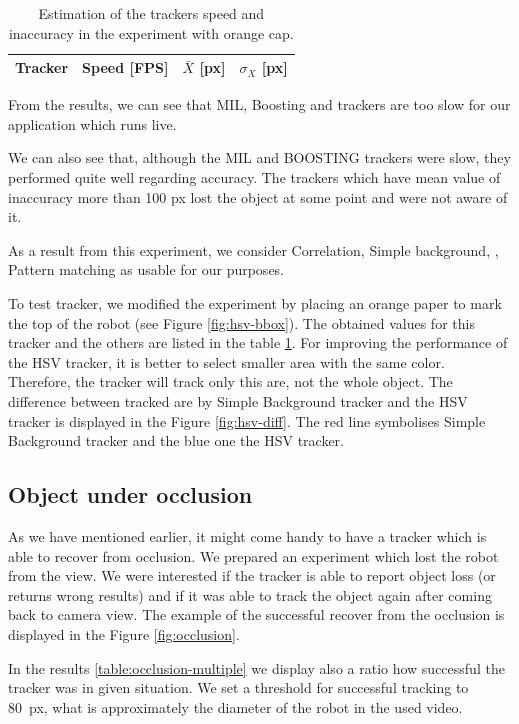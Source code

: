 \begin{table}
\centering
\begin{tabular}{l|r|r|r}
Tracker	& Speed [FPS] & $\bar{X}$ [px] & $\sigma_X$ [px] \\
\hline

\end{tabular}
\caption{Estimation of the trackers speed and inaccuracy in the experiment with orange cap.}
\label{table:hsv}
\end{table}

From the results, we can see that MIL, Boosting and \tld{} trackers are too slow
for our application which runs live.

We can also see that, although the MIL and BOOSTING trackers were slow, they
performed quite well regarding accuracy. The trackers which have mean value of
inaccuracy more than 100 px lost the object at some point and were not aware of
it.

As a result from this experiment, we consider Correlation, Simple background,
\medflow{}, Pattern matching as usable for our purposes.

To test \hsv{} tracker, we modified the experiment by placing an orange paper to
mark the top of the robot (see Figure \ref{fig:hsv-bbox}). The obtained
values for this tracker and the others are listed in the table \ref{table:hsv}.
For improving the performance of the HSV tracker, it is better to select
smaller area with the same color. Therefore, the tracker will track only this
are, not the whole object. The difference between tracked are by Simple
Background tracker and the HSV tracker is displayed in the Figure
\ref{fig:hsv-diff}. The red line symbolises Simple Background tracker and the
blue one the HSV tracker.

\subsection{Object under occlusion}

As we have mentioned earlier, it might come handy to have a tracker which is
able to recover from occlusion. We prepared an experiment which lost the
robot from the view. We were interested if the tracker is able to report object
loss (or returns wrong results) and if it was able to track the object again
after coming back to camera view. The example of the successful recover from
the occlusion is displayed in the Figure \ref{fig:occlusion}.

In the results \ref{table:occlusion-multiple} we display also a ratio how
successful the tracker was in given situation. We set a threshold for
successful tracking to 80~px, what is approximately the diameter of the robot
in the used video.

